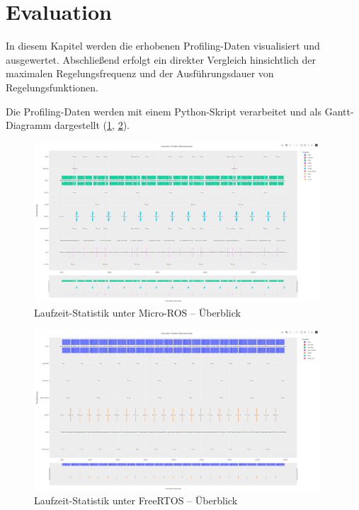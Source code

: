 \section{Evaluation}

In diesem Kapitel werden die erhobenen Profiling-Daten visualisiert und
ausgewertet. Abschließend erfolgt ein direkter Vergleich hinsichtlich der
maximalen Regelungsfrequenz und der Ausführungsdauer von Regelungsfunktionen.

Die Profiling-Daten werden mit einem Python-Skript verarbeitet und als
Gantt-Diagramm dargestellt (\ref{fig:micro_ros_profiling},
\ref{fig:freertos_profiling}).

\begin{figure}[H]
    \centering
    \includegraphics[width=0.95\textwidth]{assets/micro_ros_profiling}
    \caption{Laufzeit-Statistik unter Micro-ROS -- Überblick}
    \label{fig:micro_ros_profiling}
\end{figure}

\begin{figure}[H]
    \centering
    \includegraphics[width=0.95\textwidth]{assets/freertos_profiling}
    \caption{Laufzeit-Statistik unter FreeRTOS -- Überblick}
    \label{fig:freertos_profiling}
\end{figure}

